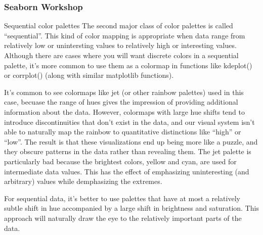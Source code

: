 \begin{frame}[fragile]
\frametitle{Seaborn Workshop}
\large

Sequential color palettes
The second major class of color palettes is called “sequential”. This kind of color mapping is appropriate when data range from relatively low or unintersting values to relatively high or interesting values. Although there are cases where you will want discrete colors in a sequential palette, it’s more common to use them as a colormap in functions like kdeplot() or corrplot() (along with similar matplotlib functions).

It’s common to see colormaps like jet (or other rainbow palettes) used in this case, becuase the range of hues gives the impression of providing additional information about the data. However, colormaps with large hue shifts tend to introduce discontinuities that don’t exist in the data, and our visual system isn’t able to naturally map the rainbow to quantitative distinctions like “high” or “low”. The result is that these visualizations end up being more like a puzzle, and they obscure patterns in the data rather than revealing them. The jet palette is particularly bad because the brightest colors, yellow and cyan, are used for intermediate data values. This has the effect of emphasizing uninteresting (and arbitrary) values while demphasizing the extremes.

For sequential data, it’s better to use palettes that have at most a relatively subtle shift in hue accompanied by a large shift in brightness and saturation. This approach will naturally draw the eye to the relatively important parts of the data.
\end{frame}
